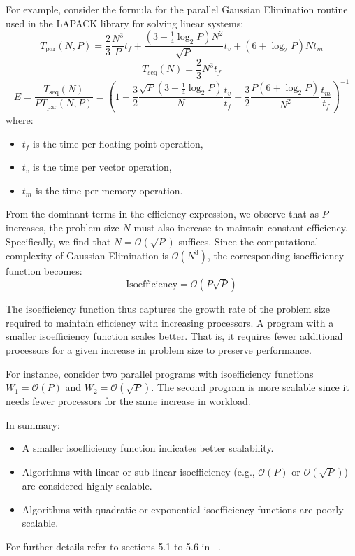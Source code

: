 \documentclass[12pt]{book}
\begin{document}
\begin{itemize}
For example, consider the formula for the parallel Gaussian Elimination routine used in the LAPACK library for solving linear systems:
\[
T_{\text{par}}(N,P) = \frac{2}{3} \frac{N^3}{P} t_f + \frac{(3 + \frac{1}{4} \log_2 P) N^2}{\sqrt{P}} t_v + (6 + \log_2 P) N t_m
\]
\[
T_{\text{seq}}(N) = \frac{2}{3} N^3 t_f
\]
\[
E = \frac{T_{\text{seq}}(N)}{P T_{\text{par}}(N,P)} = \left( 1 + \frac{3}{2} \frac{\sqrt{P}(3 + \frac{1}{4} \log_2 P)}{N} \frac{t_v}{t_f} + \frac{3}{2} \frac{P(6 + \log_2 P)}{N^2} \frac{t_m}{t_f} \right)^{-1}
\]
where:
\begin{itemize}
    \item $t_f$ is the time per floating-point operation,
    \item $t_v$ is the time per vector operation,
    \item $t_m$ is the time per memory operation.
\end{itemize}

From the dominant terms in the efficiency expression, we observe that as $P$ increases, the problem size $N$ must also increase to maintain constant efficiency. Specifically, we find that $N = \mathcal{O}(\sqrt{P})$ suffices. Since the computational complexity of Gaussian Elimination is $\mathcal{O}(N^3)$, the corresponding isoefficiency function becomes:
\[
\text{Isoefficiency} = \mathcal{O}(P \sqrt{P})
\]

The isoefficiency function thus captures the growth rate of the problem size required to maintain efficiency with increasing processors. A program with a smaller isoefficiency function scales better. That is, it requires fewer additional processors for a given increase in problem size to preserve performance.

For instance, consider two parallel programs with isoefficiency functions $W_1 = \mathcal{O}(P)$ and $W_2 = \mathcal{O}(\sqrt{P})$. The second program is more scalable since it needs fewer processors for the same increase in workload.

In summary:
\begin{itemize}
    \item A smaller isoefficiency function indicates better scalability.
    \item Algorithms with linear or sub-linear isoefficiency (e.g., $\mathcal{O}(P)$ or $\mathcal{O}(\sqrt{P})$) are considered highly scalable.
    \item Algorithms with quadratic or exponential isoefficiency functions are poorly scalable.
\end{itemize}

\end{itemize}
For further details refer to sections 5.1 to 5.6 in ~\cite{kumar1994introduction}.
\end{document}
